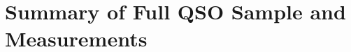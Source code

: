 \chapter[Summary of Full QSO Sample and Measurements]{Summary of Full QSO Sample and Measurements}
\label{chap:chap5}









